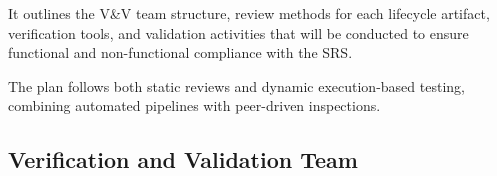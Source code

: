 \documentclass[12pt, titlepage]{article}
\begin{document}
It outlines the V\&V team structure, review methods for each lifecycle artifact,
verification tools, and validation activities that will be conducted to ensure
functional and non-functional compliance with the SRS.

The plan follows both static reviews and dynamic execution-based testing,
combining automated pipelines with peer-driven inspections.

\subsection{Verification and Validation Team}
\label{subsec:vnv-team}
\end{document}
